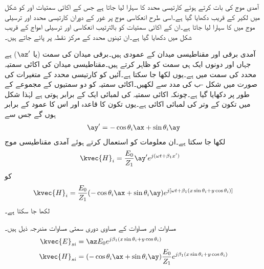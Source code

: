 آمدی موج کی بات کرتے ہوئے کارتیسی محدد  کا سہارا لیا جاتا ہے  جس کے اکائی سمتیات  اور  کو  شکل  میں لکیر  کے قریب دکھایا گیا ہے۔اسی طرح  انعکاسی موج پر غور کے دوران  کارتیسی محدد  اور ترسیلی موج میں  کا سہارا لیا جاتا ہے۔ان کے اکائی سمتیات کو بالترتیب  انعکاسی اور ترسیلی امواج کے قریب شکل  میں دکھایا گیا ہے۔ان تینوں محدد کے مرکز نقطہ  پر پائے جاتے ہیں۔

آمدی برقی اور مقناطیسی میدان  کے عمودی ہیں۔برقی میدان کی سمت  (یا $\az'$) ہے جہاں  اور  دونوں ایک ہی سمت کو ظاہر کرتے ہیں۔مقناطیسی میدان   کی اکائی سمتیہ  محدد   کی سمت میں ہے۔یوں   لکھا جا سکتا ہے۔آئیں  کو کارتیسی محدد  کے متغیرات کی صورت میں شکل -ب کی مدد سے لکھیں۔اکائی سمتیہ  کو دو سمتیوں کے مجموعے کے طور پر دکھایا گیا ہے۔چونکہ اکائی سمتیہ کی لمبائی ایک کے برابر ہوتی ہے لہٰذا شکل میں تکون کے وتر کی لمبائی اکائی ہے۔یوں  تکون کا قاعدہ  اور اس کا عمود  کے برابر ہوں گے جس سے
\begin{align}\label{مساوات_ترچھی_اکائی_وائے_ڈیش}
\ay'=-\cos \theta_i \ax+\sin \theta_i \ay
\end{align} 
لکھا جا سکتا ہے۔ان معلومات کو استعمال کرتے ہوئے آمدی مقناطیسی موج
\begin{align*}
\kvec{H}_i&=\frac{E_0}{Z_1} \ay' e^{j(\omega t +\beta_1 x')}
\end{align*}
کو
\begin{align}\label{مساوات_ترچھی_عمودی_برقی_میں_مقناطیسی_آمدی}
\kvec{H}_i=\frac{E_0}{Z_1} (-\cos \theta_i \ax+\sin \theta_i \ay) e^{j[\omega t +\beta_1 (x\sin \theta_i +y \cos \theta_i)]}
\end{align}
لکھا جا سکتا ہے۔

مساوات  اور مساوات  کے مساوی دوری سمتی مساوات مندرجہ ذیل ہیں۔
\begin{align}
\kvec{E}_{si} & = \az E_0 e^{j\beta_1 (x\sin \theta_i +y \cos \theta_i)} \label{مساوات_ترچھی_آمدی_برقی_میدان_دوری_سمتی}\\
\kvec{H}_{si} & = (-\cos \theta_i \ax+\sin \theta_i \ay)\frac{E_0}{Z_1} e^{j\beta_1 (x\sin \theta_i +y \cos \theta_i)} \label{مساوات_ترچھی_آمدی_مقناطیسی_میدان_دوری_سمتی}
\end{align}

